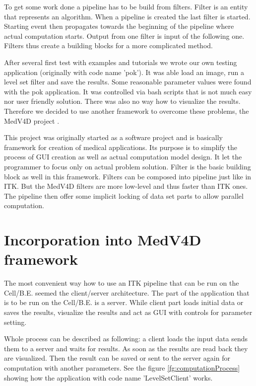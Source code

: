 \par
To get some work done a pipeline has to be build from filters.
Filter is an entity that represents an algorithm.
When a pipeline is created the last filter is started.
Starting event then propagates towards the beginning of the pipeline where actual computation starts.
Output from one filter is input of the following one.
Filters thus create a building blocks for a more complicated method.

\par
After several first test with examples and tutorials we wrote our own testing application (originally with code name 'pok').
It was able load an image, run a level set filter and save the results.
Some reasonable parameter values were found with the pok application.
It was controlled via bash scripts that is not much easy nor user friendly solution.
There was also no way how to visualize the results.
Therefore we decided to use another framework to overcome these problems, the MedV4D project \cite{medved}.

\par
This project was originally started as a software project and is basically framework for creation of medical applications.
Its purpose is to simplify the process of GUI creation as well as actual computation model design.
It let the programmer to focus only on actual problem solution.
Filter is the basic building block as well in this framework.
Filters can be composed into pipeline just like in ITK.
But the MedV4D filters are more low-level and thus faster than ITK ones.
The pipeline then offer some implicit locking of data set parts to allow parallel computation.

\section{Incorporation into MedV4D framework}

\par
The most convenient way how to use an ITK pipeline that can be run on the \mbox{Cell/B.E.} seemed the client/server architecture.
The part of the application that is to be run on the \mbox{Cell/B.E.} is a server.
While client part loads initial data or saves the results, visualize the results and act as GUI with controls for parameter setting.

\par
Whole process can be described as following: a client loads the input data sends them to a server and waits for results.
As soon as the results are read back they are visualized.
Then the result can be saved or sent to the server again for computation with another parameters.
See the figure \ref{fg:computationProcess} showing how the application with code name 'LevelSetClient' works.

